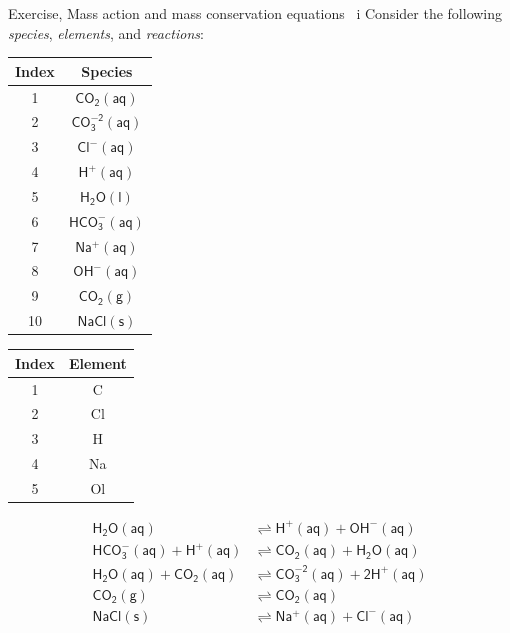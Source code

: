 \begin{frame}{Exercise, Mass action and mass conservation equations \, i}
Consider the following \emph{species}, \emph{elements}, and\emph{
reactions}:

\footnotesize
\lcol[0.3]

\begin{center}
\begin{tabular}{cc}
\toprule 
\textbf{Index} & \textbf{Species}\tabularnewline
\midrule
1 & \textrm{$\mathsf{CO_{2}(aq)}$}\tabularnewline
2 & \textrm{$\mathsf{CO_{3}^{-2}(aq)}$}\tabularnewline
3 & \textrm{$\mathsf{Cl^{-}(aq)}$}\tabularnewline
4 & \textrm{$\mathsf{H^{+}(aq)}$}\tabularnewline
5 & \textrm{$\mathsf{H_{2}O(l)}$}\tabularnewline
6 & \textrm{$\mathsf{HCO_{3}^{-}(aq)}$}\tabularnewline
7 & \textrm{$\mathsf{Na^{+}(aq)}$}\tabularnewline
8 & \textrm{$\mathsf{OH^{-}(aq)}$}\tabularnewline
9 & \textrm{$\mathsf{CO_{2}(g)}$}\tabularnewline
10 & \textrm{$\mathsf{NaCl(s)}$}\tabularnewline
\bottomrule
\end{tabular}
\par\end{center}

\rcol[0.1]
\begin{center}
\begin{tabular}{cc}
\toprule 
\textbf{Index} & \textbf{Element}\tabularnewline
\midrule
1 & C\tabularnewline
2 & Cl\tabularnewline
3 & H\tabularnewline
4 & Na\tabularnewline
5 & Ol\tabularnewline
\bottomrule
\end{tabular}
\par\end{center}

\rcol[0.6]

\begin{align*}
\mathsf{H_{2}O(aq)} & \mathsf{\rightleftharpoons H^{+}(aq)+OH^{-}(aq)}\tag{1}\\
\mathsf{HCO_{3}^{-}(aq)+H^{+}(aq)} & \mathsf{\rightleftharpoons CO_{2}(aq)+H_{2}O(aq)}\tag{2}\\
\mathsf{H_{2}O(aq)+CO_{2}(aq)} & \mathsf{\rightleftharpoons CO_{3}^{-2}(aq)+2H^{+}(aq)}\tag{3}\\
\mathsf{CO_{2}(g)} & \mathsf{\rightleftharpoons CO_{2}(aq)}\tag{4}\\
\mathsf{NaCl(s)} & \mathsf{\rightleftharpoons Na^{+}(aq)+Cl^{-}(aq)}\tag{5}
\end{align*}

\ecol
\end{frame}
%
